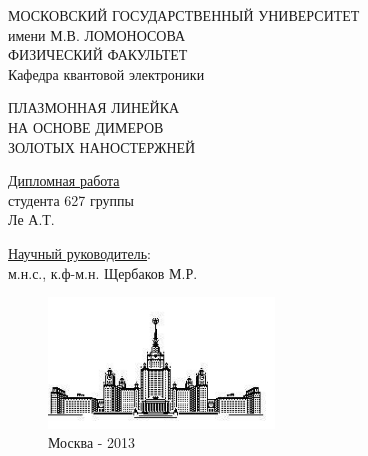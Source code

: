 \begin{titlepage}
\begin{center}
{\Large

МОСКОВСКИЙ ГОСУДАРСТВЕННЫЙ УНИВЕРСИТЕТ\\
имени М.В. ЛОМОНОСОВА\\
ФИЗИЧЕСКИЙ ФАКУЛЬТЕТ\\
Кафедра квантовой электроники

\vspace{5cm}

ПЛАЗМОННАЯ ЛИНЕЙКА \\
НА ОСНОВЕ ДИМЕРОВ \\
ЗОЛОТЫХ НАНОСТЕРЖНЕЙ

}
\end{center}


\vspace{4cm}
\begin{flushright}
\underline{Дипломная работа}\\
студента 627 группы\\
Ле А.Т.

\vspace{1cm}

\underline{Научный руководитель}:\\
м.н.с., к.ф-м.н. Щербаков М.Р.\\
\end{flushright}

\vspace{1cm}
\begin{figure}[b]
\centering
\includegraphics[width=60mm]{img/msu2.jpg}\\
Москва - 2013
\end{figure}

\end{titlepage}